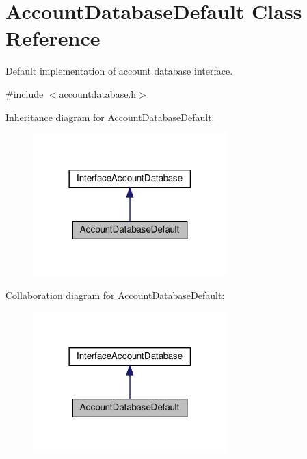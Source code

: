 \hypertarget{classAccountDatabaseDefault}{}\section{Account\+Database\+Default Class Reference}
\label{classAccountDatabaseDefault}


Default implementation of account database interface.  




{\ttfamily \#include $<$accountdatabase.\+h$>$}



Inheritance diagram for Account\+Database\+Default\+:\nopagebreak
\begin{figure}[H]
\begin{center}
\leavevmode
\includegraphics[width=213pt]{d7/d4b/classAccountDatabaseDefault__inherit__graph}
\end{center}
\end{figure}


Collaboration diagram for Account\+Database\+Default\+:\nopagebreak
\begin{figure}[H]
\begin{center}
\leavevmode
\includegraphics[width=213pt]{df/dcc/classAccountDatabaseDefault__coll__graph}
\end{center}
\end{figure}
